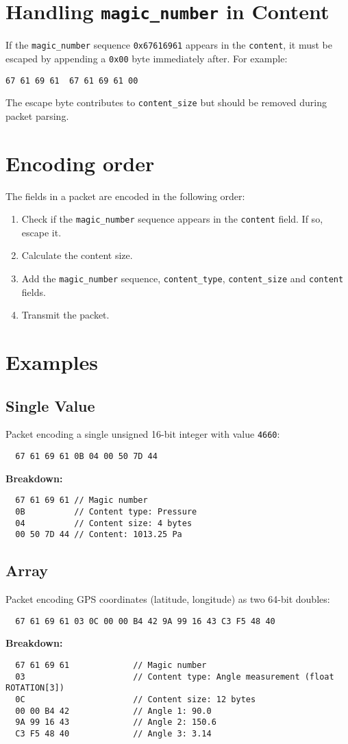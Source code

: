 \documentclass[a4paper]{article}
\begin{document}
\section{Handling \texttt{magic\_number} in Content}
If the \texttt{magic\_number} sequence \texttt{0x67616961} appears in the \texttt{content}, it must be escaped by appending a \texttt{0x00} byte immediately after. For example:

\texttt{67 61 69 61 }\textrightarrow\texttt{ 67 61 69 61 00}

The escape byte contributes to \texttt{content\_size} but should be removed during packet parsing.

\section{Encoding order}
The fields in a packet are encoded in the following order:
\begin{enumerate}
  \item Check if the \texttt{magic\_number} sequence appears in the \texttt{content} field. If so, escape it.
  \item Calculate the content size.
  \item Add the \texttt{magic\_number} sequence, \texttt{content\_type}, \texttt{content\_size} and \texttt{content} fields.
  \item Transmit the packet.
\end{enumerate}

\section{Examples}
\subsection{Single Value}
Packet encoding a single unsigned 16-bit integer with value \texttt{4660}:
\begin{verbatim}
  67 61 69 61 0B 04 00 50 7D 44
\end{verbatim}
\textbf{Breakdown:}
\begin{verbatim}
  67 61 69 61 // Magic number
  0B          // Content type: Pressure
  04          // Content size: 4 bytes
  00 50 7D 44 // Content: 1013.25 Pa
\end{verbatim}

\subsection{Array}
Packet encoding GPS coordinates (latitude, longitude) as two 64-bit doubles:
\begin{verbatim}
  67 61 69 61 03 0C 00 00 B4 42 9A 99 16 43 C3 F5 48 40
\end{verbatim}
\textbf{Breakdown:}
\begin{verbatim}
  67 61 69 61             // Magic number
  03                      // Content type: Angle measurement (float ROTATION[3])
  0C                      // Content size: 12 bytes
  00 00 B4 42             // Angle 1: 90.0
  9A 99 16 43             // Angle 2: 150.6
  C3 F5 48 40             // Angle 3: 3.14
\end{verbatim}
\end{document}
